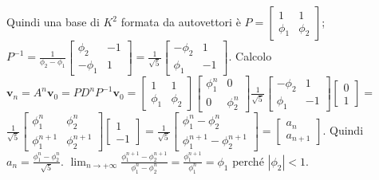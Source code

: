 \documentclass{article}
\begin{document}
\begin{enumerate}
Quindi una base di $K^{2}$ formata da autovettori \`{e} $P=\left[ 
\begin{array}{cc}
1 & 1 \\ 
\phi _{1} & \phi _{2}%
\end{array}%
\right] $; $P^{-1}=\frac{1}{\phi _{2}-\phi _{1}}\left[ 
\begin{array}{cc}
\phi _{2} & -1 \\ 
-\phi _{1} & 1%
\end{array}%
\right] =\frac{1}{\sqrt{5}}\left[ 
\begin{array}{cc}
-\phi _{2} & 1 \\ 
\phi _{1} & -1%
\end{array}%
\right] $. Calcolo $\mathbf{v}_{n}=A^{n}\mathbf{v}_{0}=PD^{n}P^{-1}\mathbf{v}%
_{0}=\left[ 
\begin{array}{cc}
1 & 1 \\ 
\phi _{1} & \phi _{2}%
\end{array}%
\right] \left[ 
\begin{array}{cc}
\phi _{1}^{n} & 0 \\ 
0 & \phi _{2}^{n}%
\end{array}%
\right] \frac{1}{\sqrt{5}}\left[ 
\begin{array}{cc}
-\phi _{2} & 1 \\ 
\phi _{1} & -1%
\end{array}%
\right] \left[ 
\begin{array}{c}
0 \\ 
1%
\end{array}%
\right] =$ $\frac{1}{\sqrt{5}}\left[ 
\begin{array}{cc}
\phi _{1}^{n} & \phi _{2}^{n} \\ 
\phi _{1}^{n+1} & \phi _{2}^{n+1}%
\end{array}%
\right] \left[ 
\begin{array}{c}
1 \\ 
-1%
\end{array}%
\right] =\frac{1}{\sqrt{5}}\left[ 
\begin{array}{c}
\phi _{1}^{n}-\phi _{2}^{n} \\ 
\phi _{1}^{n+1}-\phi _{2}^{n+1}%
\end{array}%
\right] =\left[ 
\begin{array}{c}
a_{n} \\ 
a_{n+1}%
\end{array}%
\right] $. Quindi $a_{n}=\frac{\phi _{1}^{n}-\phi _{2}^{n}}{\sqrt{5}}$. $%
\lim_{n\rightarrow +\infty }\frac{\phi _{1}^{n+1}-\phi _{2}^{n+1}}{\phi
_{1}^{n}-\phi _{2}^{n}}=\frac{\phi _{1}^{n+1}}{\phi _{1}^{n}}=\phi _{1}$
perch\'{e} $\left\vert \phi _{2}\right\vert <1$.
\end{enumerate}
\end{document}

